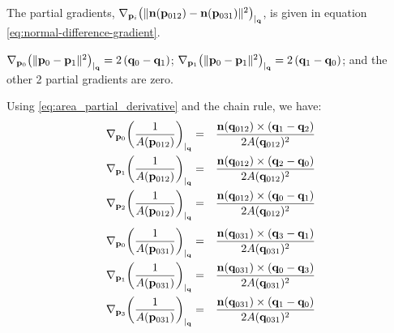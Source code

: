 The partial gradients,
${\mathbf \nabla}_{{\mathbf p}_i}{{\left(\| {\mathbf n}({\mathbf p}_{012}) - {\mathbf n}({\mathbf p}_{031}) \|^2 \right)}}_{\mid_{{\mathbf q}}}$,
is given in equation \ref{eq:normal-difference-gradient}.

${\mathbf \nabla}_{{\mathbf p}_0}{{\left(\| {\mathbf p}_0 - {\mathbf p}_1 \|^2\right)}}_{\mid_{{\mathbf q}}} = 2 \left( {\mathbf q}_0 - {\mathbf q}_1 \right)$;
${\mathbf \nabla}_{{\mathbf p}_1}{{\left(\| {\mathbf p}_0 - {\mathbf p}_1 \|^2\right)}}_{\mid_{{\mathbf q}}} = 2 \left( {\mathbf q}_1 - {\mathbf q}_0 \right)$;
and the other 2 partial gradients are zero.

Using \ref{eq:area_partial_derivative}
and the chain rule, we have:
\begin{eqnarray}
\label{eq:inverse-area-gradient-012}
\Gc{\p_0}{\left( \frac{1}{A(\p_{012})} \right)}{\q}
& = &
{{\n(\q_{012}) \times \left( \q_1 - \q_2 \right)}
\over
{2 A(\q_{012})^2 } }
\\
\Gc{\p_1}{\left( \frac{1}{A(\p_{012})} \right)}{\q}
& = &
{{\n(\q_{012}) \times \left( \q_2 - \q_0 \right)}
\over
{2 A(\q_{012})^2 } }
\nonumber
\\
\Gc{\p_2}{\left( \frac{1}{A(\p_{012})} \right)}{\q}
& = &
{{\n(\q_{012}) \times \left( \q_0 - \q_1 \right)}
\over
{2 A(\q_{012})^2 } }
\nonumber
\end{eqnarray}
\begin{eqnarray}
\label{eq:inverse-area-gradient-031}
\Gc{\p_0}{\left( \frac{1}{A(\p_{031})} \right)}{\q}
& = &
{{\n(\q_{031}) \times \left( \q_3 - \q_1 \right)}
\over
{2 A(\q_{031})^2 } }
\\
\Gc{\p_1}{\left( \frac{1}{A(\p_{031})} \right)}{\q}
& = &
{{\n(\q_{031}) \times \left( \q_0 - \q_3 \right)}
\over
{2 A(\q_{031})^2 } }
\nonumber
\\
\Gc{\p_3}{\left( \frac{1}{A(\p_{031})} \right)}{\q}
& = &
{{\n(\q_{031}) \times \left( \q_1 - \q_0 \right)}
\over
{2 A(\q_{031})^2 } }
\nonumber
\end{eqnarray}

